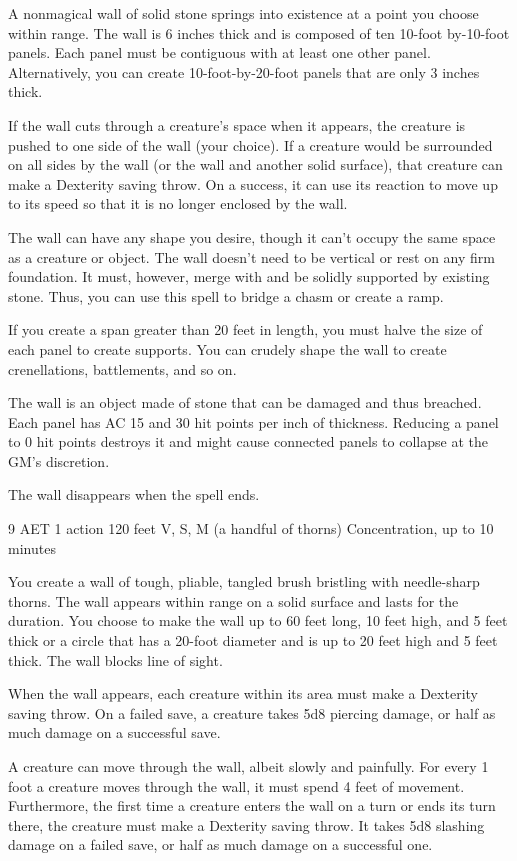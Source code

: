A nonmagical wall of solid stone springs into existence at a point you choose within range. The wall is 6 inches thick and is composed of ten 10-foot by-10-foot panels. Each panel must be contiguous with at least one other panel. Alternatively, you can create 10-foot-by-20-foot panels that are only 3 inches thick.

If the wall cuts through a creature's space when it appears, the creature is pushed to one side of the wall (your choice). If a creature would be surrounded on all sides by the wall (or the wall and another solid surface), that creature can make a Dexterity saving throw. On a success, it can use its reaction to move up to its speed so that it is no longer enclosed by the wall.

The wall can have any shape you desire, though it can't occupy the same space as a creature or object. The wall doesn't need to be vertical or rest on any firm foundation. It must, however, merge with and be solidly supported by existing stone. Thus, you can use this spell to bridge a chasm or create a ramp.

If you create a span greater than 20 feet in length, you must halve the size of each panel to create supports. You can crudely shape the wall to create crenellations, battlements, and so on.

The wall is an object made of stone that can be damaged and thus breached. Each panel has AC 15 and 30 hit points per inch of thickness. Reducing a panel to 0 hit points destroys it and might cause connected panels to collapse at the GM's discretion.

The wall disappears when the spell ends.

{9 AET}
{1 action}
{120 feet}
{V, S, M (a handful of thorns)}
{Concentration, up to 10 minutes}

You create a wall of tough, pliable, tangled brush bristling with needle-sharp thorns. The wall appears within range on a solid surface and lasts for the duration. You choose to make the wall up to 60 feet long, 10 feet high, and 5 feet thick or a circle that has a 20-foot diameter and is up to 20 feet high and 5 feet thick. The wall blocks line of sight.

When the wall appears, each creature within its area must make a Dexterity saving throw. On a failed save, a creature takes 5d8 piercing damage, or half as much damage on a successful save.

A creature can move through the wall, albeit slowly and painfully. For every 1 foot a creature moves through the wall, it must spend 4 feet of movement. Furthermore, the first time a creature enters the wall on a turn or ends its turn there, the creature must make a Dexterity saving throw. It takes 5d8 slashing damage on a failed save, or half as much damage on a successful one.

